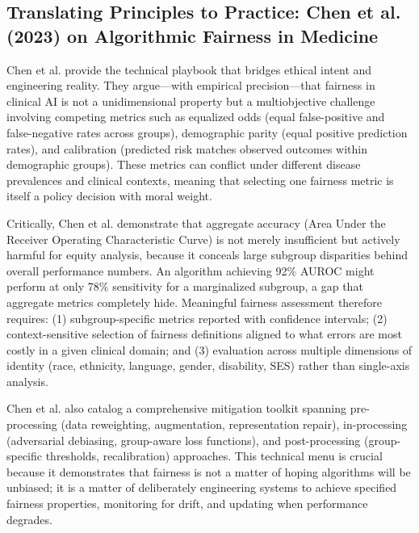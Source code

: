 \documentclass[12pt,letterpaper]{article}
\begin{document}
\subsection{Translating Principles to Practice: Chen et al. (2023) on Algorithmic Fairness in Medicine}

Chen et al. provide the technical playbook that bridges ethical intent and engineering reality. They argue---with empirical precision---that fairness in clinical AI is not a unidimensional property but a multiobjective challenge involving competing metrics such as equalized odds (equal false-positive and false-negative rates across groups), demographic parity (equal positive prediction rates), and calibration (predicted risk matches observed outcomes within demographic groups).\cite{chen2023} These metrics can conflict under different disease prevalences and clinical contexts, meaning that selecting one fairness metric is itself a policy decision with moral weight.\cite{chen2023}

Critically, Chen et al. demonstrate that aggregate accuracy (Area Under the Receiver Operating Characteristic Curve) is not merely insufficient but actively harmful for equity analysis, because it conceals large subgroup disparities behind overall performance numbers.\cite{chen2023} An algorithm achieving 92\% AUROC might perform at only 78\% sensitivity for a marginalized subgroup, a gap that aggregate metrics completely hide. Meaningful fairness assessment therefore requires: (1) subgroup-specific metrics reported with confidence intervals; (2) context-sensitive selection of fairness definitions aligned to what errors are most costly in a given clinical domain; and (3) evaluation across multiple dimensions of identity (race, ethnicity, language, gender, disability, SES) rather than single-axis analysis.\cite{chen2023}

Chen et al. also catalog a comprehensive mitigation toolkit spanning pre-processing (data reweighting, augmentation, representation repair), in-processing (adversarial debiasing, group-aware loss functions), and post-processing (group-specific thresholds, recalibration) approaches.\cite{chen2023} This technical menu is crucial because it demonstrates that fairness is not a matter of hoping algorithms will be unbiased; it is a matter of deliberately engineering systems to achieve specified fairness properties, monitoring for drift, and updating when performance degrades.\cite{chen2023}
\end{document}
